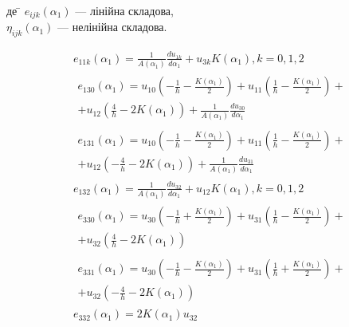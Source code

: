 \documentclass[10pt,a4paper]{article}
\numberwithin{figure}{section}
\numberwithin{equation}{section}
\begin{document}
\begin{tabbing}
де \= $e_{ijk}\left( \alpha_1\right)$ --- лінійна складова,\\
\> $\eta_{ijk}\left( \alpha_1\right)$ --- нелінійна складова.
\end{tabbing}


\begin{equation}\label{eq:sqt_strain_l}
\begin{aligned}
&e_{11k}\left(\alpha_1\right)=\frac{1}{A\left(\alpha_1\right)}\frac{du_{1k}}{d\alpha_1}+u_{3k}K\left(\alpha_1\right), k=0,1,2
\\
&\begin{split}
e_{130}\left(\alpha_1\right)=u_{10}\left( -\frac{1}{h}-\frac{K\left( \alpha_1 \right)}{2} \right)+u_{11}\left( \frac{1}{h}-\frac{K\left( \alpha_1 \right)}{2} \right)+ \\ +u_{12}\left( \frac{4}{h}-2K\left( \alpha_1 \right) \right) + \frac{1}{A\left(\alpha_1\right)}\frac{du_{30}}{d\alpha_1}
\end{split}\\
&\begin{split}
e_{131}\left(\alpha_1\right)=u_{10}\left( -\frac{1}{h}-\frac{K\left( \alpha_1 \right)}{2} \right)+u_{11}\left( \frac{1}{h}-\frac{K\left( \alpha_1 \right)}{2} \right)+\\+u_{12}\left( - \frac{4}{h}-2K\left( \alpha_1 \right) \right) + \frac{1}{A\left(\alpha_1\right)}\frac{du_{31}}{d\alpha_1}
\end{split}\\
&e_{132}\left(\alpha_1\right)=\frac{1}{A\left(\alpha_1\right)}\frac{du_{32}}{d\alpha_1}+u_{12}K\left(\alpha_1\right), k=0,1,2\\
&\begin{split}
e_{330}\left(\alpha_1\right)=u_{30}\left( -\frac{1}{h}+\frac{K\left( \alpha_1 \right)}{2} \right)+u_{31}\left( \frac{1}{h}-\frac{K\left( \alpha_1 \right)}{2} \right)+\\+u_{32}\left( \frac{4}{h}-2K\left( \alpha_1 \right) \right)
\end{split}\\
&\begin{split}
e_{331}\left(\alpha_1\right)=u_{30}\left( -\frac{1}{h}-\frac{K\left( \alpha_1 \right)}{2} \right)+u_{31}\left( \frac{1}{h}+\frac{K\left( \alpha_1 \right)}{2} \right)+\\+u_{32}\left( -\frac{4}{h}-2K\left( \alpha_1 \right) \right)
\end{split}\\
&e_{332}\left(\alpha_1\right)=2K\left( \alpha_1 \right)u_{32}
\end{aligned}
\end{equation}
\end{document}
